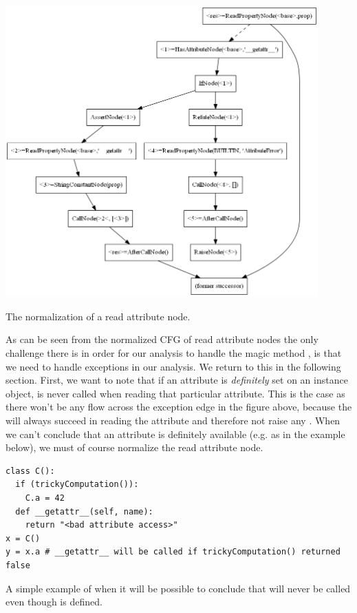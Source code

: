 \begin{listing}[H]
  \begin{center}
    \includegraphics[width=0.9\textwidth]{images/readproperty.png}
  \end{center}
  \vspace{-10pt}
  \caption{The normalization of a read attribute node.}
  \label{fig:MagicMethods1}
\end{listing}

As can be seen from the normalized CFG of read attribute nodes the only challenge there is in order for our analysis to handle the magic method , is that we need to handle exceptions in our analysis. We return to this in the following section. First, we want to note that if an attribute is \textit{definitely} set on an instance object,  is never called when reading that particular attribute. This is the case as there won't be any flow across the exception edge in the figure above, because the  will always succeed in reading the attribute and therefore not raise any . When we can't conclude that an attribute is definitely available (e.g. as in the example below), we must of course normalize the read attribute node.

\begin{listing}[H]
  \begin{verbatim}
class C():
  if (trickyComputation()):
    C.a = 42
  def __getattr__(self, name):
    return "<bad attribute access>"
x = C()
y = x.a # __getattr__ will be called if trickyComputation() returned false
  \end{verbatim}
  \caption{A simple example of when it will be possible to conclude that  will never be called even though  is defined.}
  \label{code:MagicMethods2}
\end{listing}

